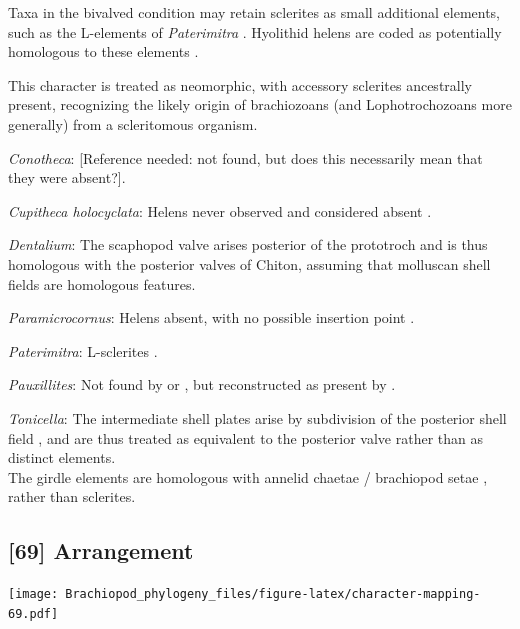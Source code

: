 \documentclass[openany]{book}
\begin{document}
Taxa in the bivalved condition may retain sclerites as small additional
elements, such as the L-elements of \emph{Paterimitra}
\citep{Skovsted2015Theearly}. Hyolithid helens are coded as potentially
homologous to these elements
\citep[following][]{Moysiuk2017Hyolithsare}.

This character is treated as neomorphic, with accessory sclerites
ancestrally present, recognizing the likely origin of brachiozoans (and
Lophotrochozoans more generally) from a scleritomous organism.

\hypertarget{Conotheca-coding-68}{}
\emph{Conotheca}: {[}Reference needed: not found, but does this
necessarily mean that they were absent?{]}.

\hypertarget{Cupitheca_holocyclata-coding-68}{}
\emph{Cupitheca holocyclata}: Helens never observed and considered
absent \citep{Skovsted2016}.

\hypertarget{Dentalium-coding-68}{}
\emph{Dentalium}: The scaphopod valve arises posterior of the prototroch
and is thus homologous with the posterior valves of Chiton, assuming
that molluscan shell fields are homologous features.

\hypertarget{Paramicrocornus-coding-68}{}
\emph{Paramicrocornus}: Helens absent, with no possible insertion point
\citep{Zhang2018Ahyolithid}.

\hypertarget{Paterimitra-coding-68}{}
\emph{Paterimitra}: L-sclerites \citep{Skovsted2009Thescleritome}.

\hypertarget{Pauxillites-coding-68}{}
\emph{Pauxillites}: Not found by \citet{Valent2015} or
\citet{Marek1966}, but reconstructed as present by \citet{Marek1976}.

\hypertarget{Tonicella-coding-68}{}
\emph{Tonicella}: The intermediate shell plates arise by subdivision of
the posterior shell field \citep{Wanninger2002C}, and are thus treated
as equivalent to the posterior valve rather than as distinct elements.\\
The girdle elements are homologous with annelid chaetae / brachiopod
setae \citep{Leise1982}, rather than sclerites.

\subsection*{{[}69{]} Arrangement}\label{arrangement}

\texttt{[image: Brachiopod\_phylogeny\_files/figure-latex/character-mapping-69.pdf]}
\end{document}
